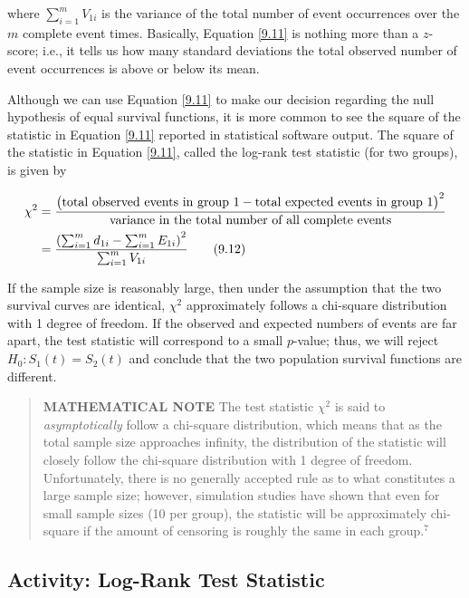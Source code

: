 \documentclass[
]{book}
\begin{document}
where \(\sum_{i=1}^m V_{1i}\) is the variance of the total number of event occurrences over the \(m\) complete event times. Basically, Equation \ref{9.11} is nothing more than a \(z\)-score; i.e., it tells us how many standard deviations the total observed number of event occurrences is above or below its mean.

Although we can use Equation \ref{9.11} to make our decision regarding the null hypothesis of equal survival functions, it is more common to see the square of the statistic in Equation \ref{9.11} reported in statistical software output. The square of the statistic in Equation \ref{9.11}, called the log-rank test statistic (for two groups), is given by

\begin{align}\label{9.12}
\chi^2 &= \frac{\bigl(\text{total observed events in group 1} - \text{total expected events in group 1}\bigr)^{2}}%
             {\text{variance in the total number of all complete events}} \notag \\
       &= \frac{\left(\sum_{i=1}^m d_{1i} - \sum_{i=1}^m E_{1i}\right)^{2}}{\sum_{i=1}^m V_{1i}}
\tag{9.12}
\end{align}

If the sample size is reasonably large, then under the assumption that the two survival curves are identical, \(\chi^2\) approximately follows a chi-square distribution with 1 degree of freedom. If the observed and expected numbers of events are far apart, the test statistic will correspond to a small \(p\)-value; thus, we will reject \(H_0: S_1(t) = S_2(t)\) and conclude that the two population survival functions are different.

\begin{quote}
\textbf{MATHEMATICAL NOTE} The test statistic \(\chi^2\) is said to \emph{asymptotically} follow a chi-square distribution, which means that as the total sample size approaches infinity, the distribution of the statistic will closely follow the chi-square distribution with 1 degree of freedom. Unfortunately, there is no generally accepted rule as to what constitutes a large sample size; however, simulation studies have shown that even for small sample sizes (10 per group), the statistic will be approximately chi-square if the amount of censoring is roughly the same in each group.\(^7\)
\end{quote}

\hypertarget{activity-log-rank-test-statistic}{%
\subsection*{Activity: Log-Rank Test Statistic}\label{activity-log-rank-test-statistic}}
\end{document}
